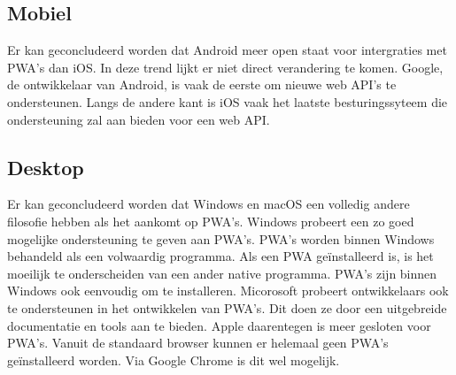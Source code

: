 \documentclass[a0,portrait]{a0poster}
\begin{document}
\begin{multicols}{2}
	\subsection{Mobiel}
		Er kan geconcludeerd worden dat Android meer open staat voor intergraties met PWA’s dan iOS. In deze trend lijkt er niet direct verandering te komen. Google, de ontwikkelaar van Android, is vaak de eerste om nieuwe web API’s te ondersteunen.
		Langs de andere kant is iOS vaak het laatste besturingssyteem die ondersteuning zal aan bieden voor een web API.

	\subsection{Desktop}
		Er kan geconcludeerd worden dat Windows en macOS een volledig andere filosofie hebben als het aankomt op PWA’s.
		Windows probeert een zo goed mogelijke ondersteuning te geven aan PWA’s. PWA’s worden binnen Windows behandeld als een volwaardig programma. Als een PWA geïnstalleerd is, is het moeilijk te onderscheiden van een ander native programma. PWA’s zijn binnen Windows ook eenvoudig om te installeren. Micorosoft probeert ontwikkelaars ook te ondersteunen in het ontwikkelen van PWA’s. Dit doen ze door een uitgebreide documentatie en tools aan te bieden.
		Apple daarentegen is meer gesloten voor PWA’s. Vanuit de standaard browser kunnen er helemaal geen PWA’s geïnstalleerd worden. Via Google Chrome is dit wel mogelijk.

\color{Black}
\color{HoGentAccent1} 

\end{multicols}
\end{document}
